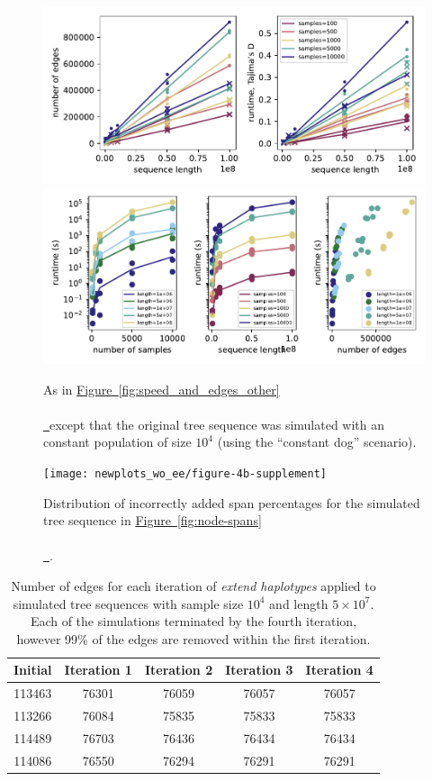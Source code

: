 \documentclass[10pt,twoside,lineno]{gsajnl}
\newcommand*{\figref}[2][]{%
	\hyperref[{#2}]{%
		Figure~\ref*{#2}%
		\ifx\\#1\\%
		\else
		\,#1%
		\fi
	}%
}
\begin{document}
\begin{figure}
    \includegraphics{benchmarks/constant_pop_results_absolute_values}
    \includegraphics{benchmarks/constant_pop_results_timing}
    \caption{
        As in \figref{fig:speed_and_edges_other} except that
        the original tree sequence was simulated with an constant population
        of size $10^4$ (using the ``constant dog'' scenario).
        \label{fig:speed_and_edges_other_constant}
    }
\end{figure}

\begin{figure}[!hbt]
	\texttt{[image: newplots\_wo\_ee/figure-4b-supplement]}
	\caption{Distribution of incorrectly added span percentages
		for the simulated tree sequence in \figref{fig:node-spans}.}
	\label{fig:incorrect_ratio}
\end{figure}


\begin{table}[!hbt]
\begin{center}
\begin{tabular}{|c|c|c|c|c|}
	\hline
	Initial & Iteration 1 & Iteration 2 & Iteration 3 & Iteration 4 \\
	\hline
	\hline
	113463	&	76301	&	76059	&	76057	&	76057 \\
	\hline
	113266 & 76084	&	75835	&	75833	&	75833 \\
	\hline
	114489 & 76703 & 76436 & 76434 & 76434 \\
	\hline
	114086	& 76550	& 76294	& 76291	& 76291\\
	\hline
\end{tabular}
\caption{Number of edges for each iteration of \textit{extend haplotypes} applied to 
simulated tree sequences with sample size $10^4$ and length $5\times 10^7$. 
Each of the simulations terminated by the fourth iteration, however 99\% of the edges
are removed within the first iteration.}
\label{tab:edge-counts}
\end{center}
\end{table}
\end{document}
